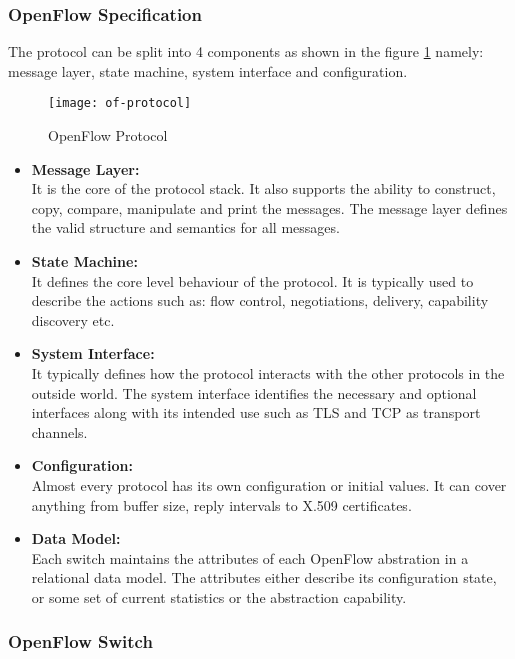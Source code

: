 \subsubsection{OpenFlow Specification \cite{Openflow_protocol_spec}} \label{OpenFlow_Protocol_spec}
The protocol can be split into 4 components as shown in the figure \ref{fig:Of_proto} namely: message layer, state machine, system interface and configuration. 
\begin{figure}
	\centering
	\texttt{[image: of-protocol]}
	\caption{OpenFlow Protocol \cite{of_protocol_spec_img}} \label{fig:Of_proto}
	\vspace{-10pt}
\end{figure}

\begin{itemize}
	\item \textbf{Message Layer:} 
	\\ It is the core of the protocol stack. It also supports the ability to construct, copy, compare, manipulate and print the messages. The message layer defines the valid structure and semantics for all messages.   
	\item \textbf{State Machine:}
	\\ It defines the core level behaviour of the protocol. It is typically used to describe the actions such as: flow control, negotiations, delivery, capability discovery etc.
	\item \textbf{System Interface:}
	\\ It typically defines how the protocol interacts with the other protocols in the outside world. The system interface identifies the necessary and optional interfaces along with its intended use such as TLS and TCP as transport channels.
	\item \textbf{Configuration:}
	\\ Almost every protocol has its own configuration or initial values. It can cover anything from buffer size, reply intervals to X.509 certificates.
	\item \textbf{Data Model:}
	\\ Each switch maintains the attributes of each OpenFlow abstration in a relational data model.  The attributes either describe its configuration state, or some set of current statistics or the abstraction capability. 

\end{itemize}

\subsubsection{OpenFlow Switch \cite{Opnflow_switch}} \label{OpenFlow_Switch}

